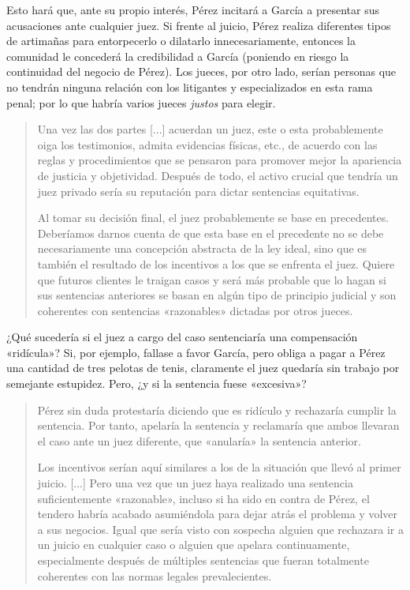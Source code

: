 \documentclass[12pt,a4paper,twoside]{book}
\begin{document}
Esto hará que, ante su propio interés, Pérez incitará a García a presentar sus acusaciones ante cualquier juez. Si frente al juicio, Pérez realiza diferentes tipos de artimañas para entorpecerlo o dilatarlo innecesariamente, entonces la comunidad le concederá la credibilidad a García (poniendo en riesgo la continuidad del negocio de Pérez). Los jueces, por otro lado, serían personas que no tendrán ninguna relación con los litigantes y especializados en esta rama penal; por lo que habría varios jueces \textit{justos} para elegir.

\begin{quotation}
Una vez las dos partes [...] acuerdan un juez, este o esta probablemente oiga los testimonios, admita evidencias físicas, etc., de acuerdo con las reglas y procedimientos que se pensaron para promover mejor la apariencia de justicia y objetividad. Después de todo, el activo crucial que tendría un juez privado sería su reputación para dictar sentencias equitativas.

Al tomar su decisión final, el juez probablemente se base en precedentes. Deberíamos darnos cuenta de que esta base en el precedente no se debe necesariamente una concepción abstracta de la ley ideal, sino que es también el resultado de los incentivos a los que se enfrenta el juez. Quiere que futuros clientes le traigan casos y será más probable que lo hagan si sus sentencias anteriores se basan en algún tipo de principio judicial y son coherentes con sentencias «razonables» dictadas por otros jueces. \cite{justicia-privada}
\end{quotation}

¿Qué sucedería si el juez a cargo del caso sentenciaría una compensación «ridícula»? Si, por ejemplo, fallase a favor García, pero obliga a pagar a Pérez una cantidad de tres pelotas de tenis, claramente el juez quedaría sin trabajo por semejante estupidez. Pero, ¿y si la sentencia fuese «excesiva»?

\begin{quotation}
Pérez sin duda protestaría diciendo que es ridículo y rechazaría cumplir la sentencia. Por tanto, apelaría la sentencia y reclamaría que ambos llevaran el caso ante un juez diferente, que «anularía» la sentencia anterior.

Los incentivos serían aquí similares a los de la situación que llevó al primer juicio. [...] Pero una vez que un juez haya realizado una sentencia suficientemente «razonable», incluso si ha sido en contra de Pérez, el tendero habría acabado asumiéndola para dejar atrás el problema y volver a sus negocios. Igual que sería visto con sospecha alguien que rechazara ir a un juicio en cualquier caso o alguien que apelara continuamente, especialmente después de múltiples sentencias que fueran totalmente coherentes con las normas legales prevalecientes. \cite{justicia-privada}
\end{quotation}
\end{document}
